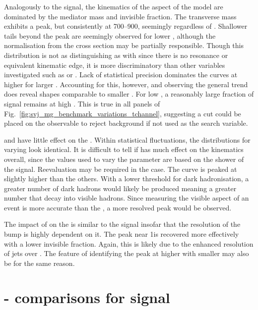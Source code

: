 Analogously to the \schannel signal, the kinematics of the \tchannel aspect of the model are dominated by the mediator mass and invisible fraction. The transverse mass exhibits a peak, but consistently at 700--900\GeV, seemingly regardless of \mBifund. Shallower tails beyond the peak are seemingly observed for lower \mBifund, although the normalisation from the cross section may be partially responsible. Though this distribution is not as distinguishing as with \schannel since there is no resonance or equivalent kinematic edge, it is more discriminatory than other variables investigated such as \ptmiss or \HT. Lack of statistical precision dominates the curves at higher \mT for larger \mBifund. Accounting for this, however, and observing the general trend does reveal shapes comparable to smaller \mBifund. For low \mBifund, a reasonably large fraction of signal remains at high \mT. This is true in all panels of Fig.~\ref{fig:svj_mg_benchmark_variations_tchannel}, suggesting a cut could be placed on the observable to reject background if not used as the search variable.

\mDark and \aDark have little effect on the \mT. Within statistical fluctuations, the distributions for varying \mDark look identical. It is difficult to tell if \aDark has much effect on the kinematics overall, since the values used to vary the parameter are based on the shower of the \schannel signal. Reevaluation may be required in the \tchannel case. The \aDarkLow curve is peaked at slightly higher \mT than the others. With a lower threshold for dark hadronisation, a greater number of dark hadrons would likely be produced meaning a greater number that decay into visible hadrons. Since measuring the visible aspect of an event is more accurate than the \ptvecmiss, a more resolved peak would be observed.

The impact of \rinv on the \mT is similar to the \schannel signal insofar that the resolution of the bump is highly dependent on it. The peak near 1\TeV is recovered more effectively with a lower invisible fraction. Again, this is likely due to the enhanced resolution of \glspl{jet} over \ptvecmiss. The feature of identifying the peak at higher \mT with smaller \rinv may also be for the same reason.




\section{\texorpdfstring{\PYTHIA}{Pythia}-\texorpdfstring{\MADGRAPH}{MadGraph} comparisons for \texorpdfstring{\schannel}{s-channel} signal}
\label{sec:svj_schannel_comparisons}


